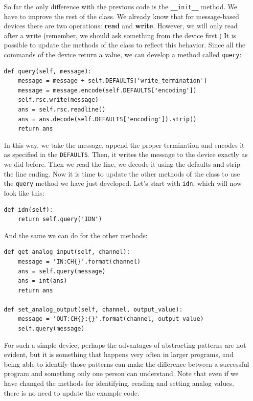 So far the only difference with the previous code is the \texttt{__init__} method. We have to improve the rest of the class. We already know that for message-based devices there are two operations: \textbf{read} and \textbf{write}. However, we will only read after a write (remember, we should ask something from the device first.) It is possible to update the methods of the class to reflect this behavior. Since all the commands of the device return a value, we can develop a method called \texttt{query}:

\begin{verbatim}
def query(self, message):
    message = message + self.DEFAULTS['write_termination']
    message = message.encode(self.DEFAULTS['encoding'])
    self.rsc.write(message)
    ans = self.rsc.readline()
    ans = ans.decode(self.DEFAULTS['encoding']).strip()
    return ans
\end{verbatim}

In this way, we take the message, append the proper termination and encodes it as specified in the \texttt{DEFAULTS}. Then, it writes the message to the
device exactly as we did before. Then we read the line, we decode it using the defaults and strip the line ending. Now it is time to update the other methods of the class to use the \texttt{query} method we have just developed. Let's start with \texttt{idn}, which will now look like this:

\begin{verbatim}
def idn(self):
    return self.query('IDN')
\end{verbatim}

And the same we can do for the other methods:

\begin{verbatim}
def get_analog_input(self, channel):
    message = 'IN:CH{}'.format(channel)
    ans = self.query(message)
    ans = int(ans)
    return ans

def set_analog_output(self, channel, output_value):
    message = 'OUT:CH{}:{}'.format(channel, output_value)
    self.query(message)
\end{verbatim}

For such a simple device, perhaps the advantages of abstracting patterns are not evident, but it is something that happens very often in larger programs, and being able to identify those patterns can make the difference between a successful program and something only one person can understand. Note that even if we have changed the methods for identifying, reading and setting analog values, there is no need to update the example code.

